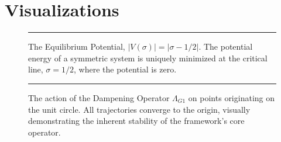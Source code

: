 \documentclass{article}
\theoremstyle{plain}
\theoremstyle{definition}
\theoremstyle{remark}
\begin{document}
\appendix
\section{Visualizations}
\begin{figure}[h!]
    \centering
    \rule{0.7\textwidth}{6cm} %
    \caption{The Equilibrium Potential, $|V(\sigma)| = |\sigma - 1/2|$. The potential energy of a symmetric system is uniquely minimized at the critical line, $\sigma=1/2$, where the potential is zero.}
    \label{fig:valley}
\end{figure}

\begin{figure}[h!]
    \centering
    \rule{0.8\textwidth}{5cm} %
    \caption{The action of the Dampening Operator $\Lambda_{G1}$ on points originating on the unit circle. All trajectories converge to the origin, visually demonstrating the inherent stability of the framework's core operator.}
    \label{fig:dampening_operator}
\end{figure}
\end{document}
